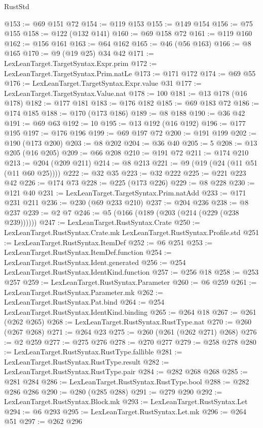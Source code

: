 \begin{lexlean}{RustStd}
\begin{coremodule}
@153 := @69 @151 @72
@154 := @119 @153
@155 := @149 @154
@156 := @75 @155
@158 := @122 (@132 @141)
@160 := @69 @158 @72
@161 := @119 @160
@162 := @156 @161
@163 := @64 @162
@165 := @46 (@56 @163)
@166 := @8 @165
@170 := @9 (@19 @25) @34 @42
@171 := LexLeanTarget.TargetSyntax.Expr.prim
@172 := LexLeanTarget.TargetSyntax.Prim.natLe
@173 := @171 @172
@174 := @69 @55
@176 := LexLeanTarget.TargetSyntax.Expr.value @31
@177 := LexLeanTarget.TargetSyntax.Value.nat
@178 := 100
@181 := @13 @178 (@16 @178)
@182 := @177 @181
@183 := @176 @182
@185 := @69 @183 @72
@186 := @174 @185
@188 := @170 (@173 @186)
@189 := @8 @188
@190 := @36 @42
@191 := @69 @63
@192 := 10
@195 := @13 @192 (@16 @192)
@196 := @177 @195
@197 := @176 @196
@199 := @69 @197 @72
@200 := @191 @199
@202 := @190 (@173 @200)
@203 := @8 @202
@204 := @36 @40
@205 := 5
@208 := @13 @205 (@16 @205)
@209 := @66 @208
@210 := @191 @72
@211 := @174 @210
@213 := @204 (@209 @211)
@214 := @8 @213
@221 := @9 (@19 (@24 (@11 @51 (@11 @60 @25))))
@222 := @32 @35
@223 := @32 @222
@225 := @221 @223 @42
@226 := @174 @73
@228 := @225 (@173 @226)
@229 := @8 @228
@230 := @121 @40
@231 := LexLeanTarget.TargetSyntax.Prim.natAdd
@233 := @171 @231 @211
@236 := @230 (@69 @233 @210)
@237 := @204 @236
@238 := @8 @237
@239 := @2 @7
@246 := @5 (@166 (@189 (@203 (@214 (@229 (@238 @239))))))
@247 := LexLeanTarget.RustSyntax.Crate
@250 := LexLeanTarget.RustSyntax.Crate.mk LexLeanTarget.RustSyntax.Profile.std
@251 := LexLeanTarget.RustSyntax.ItemDef
@252 := @6 @251
@253 := LexLeanTarget.RustSyntax.ItemDef.function
@254 := LexLeanTarget.RustSyntax.Ident.generated
@256 := @254 LexLeanTarget.RustSyntax.IdentKind.function
@257 := @256 @18
@258 := @253 @257
@259 := LexLeanTarget.RustSyntax.Parameter
@260 := @6 @259
@261 := LexLeanTarget.RustSyntax.Parameter.mk
@262 := LexLeanTarget.RustSyntax.Pat.bind
@264 := @254 LexLeanTarget.RustSyntax.IdentKind.binding
@265 := @264 @18
@267 := @261 (@262 @265)
@268 := LexLeanTarget.RustSyntax.RustType.nat
@270 := @260 (@267 @268)
@271 := @264 @23
@275 := @260 (@261 (@262 @271) @268)
@276 := @2 @259
@277 := @275 @276
@278 := @270 @277
@279 := @258 @278
@280 := LexLeanTarget.RustSyntax.RustType.fallible
@281 := LexLeanTarget.RustSyntax.RustType.result
@282 := LexLeanTarget.RustSyntax.RustType.pair
@284 := @282 @268 @268
@285 := @281 @284
@286 := LexLeanTarget.RustSyntax.RustType.bool
@288 := @282 @286 @286
@290 := @280 (@285 @288)
@291 := @279 @290
@292 := LexLeanTarget.RustSyntax.Block.mk
@293 := LexLeanTarget.RustSyntax.Let
@294 := @6 @293
@295 := LexLeanTarget.RustSyntax.Let.mk
@296 := @264 @51
@297 := @262 @296

\end{coremodule}
\end{lexlean}
